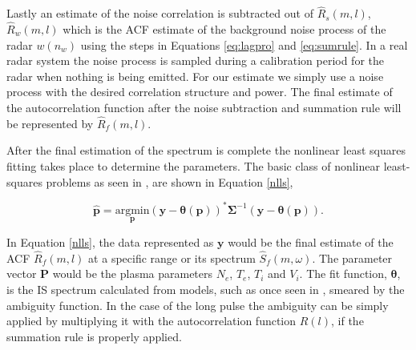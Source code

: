 \documentclass[draft,ras]{agutex}
\begin{document}
\begin{article}




Lastly an estimate of the noise correlation is subtracted out of $\hat{R}_s(m,l)$, $\hat{R}_w(m,l)$ which is the ACF estimate of the background noise process of the radar $w(n_w)$ using the steps in Equations \ref{eq:lagpro} and \ref{eq:sumrule}. In a real radar system the noise process is sampled during a calibration period for the radar when nothing is being emitted. For our estimate we simply use a noise process with the desired correlation structure and power. The final estimate of the autocorrelation function after the noise subtraction and summation rule will be represented by $\hat{R}_f(m,l)$.


After the final estimation of the spectrum is complete the nonlinear least squares fitting takes place to determine the parameters.  The basic class of nonlinear least-squares problems as seen in \citep{kayvol1}, are shown in Equation \ref{nlls},

\begin{equation}
	\hat{\mathbf{p}}= \underset{\mathbf{p}}{\text{argmin}} (\mathbf{y}-\bm{\theta}(\mathbf{p}))^*\bm{\Sigma}^{-1}(\mathbf{y}-\bm{\theta}(\mathbf{p})).
\label{nlls}
\end{equation}

In Equation \ref{nlls}, the data represented as $\mathbf{y}$ would be the final estimate of the ACF $\hat{R}_f(m,l)$ at a specific range or its spectrum $\hat{S}_f(m,\omega)$. The parameter vector $\mathbf{P}$ would be the plasma parameters $N_e$, $T_e$, $T_i$ and $V_i$. The fit function, $\bm{\theta}$, is the IS spectrum calculated from models, such as once seen in \citep{kudeki:milla:1}, smeared by the ambiguity function. In the case of the long pulse the ambiguity can be simply applied by multiplying it with the autocorrelation function $R(l)$, if the summation rule is properly applied. 


\end{article}
\end{document}
